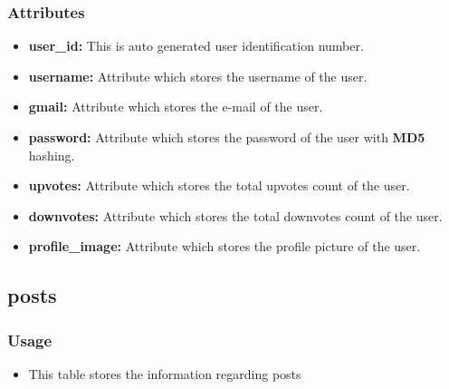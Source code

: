 \documentclass[12pt,a4paper]{article}
\begin{document}
\subsubsection{Attributes}
	\begin{itemize}
		\item \textbf{user\_id: }This is auto generated user identification number.
		\item \textbf{username: }Attribute which stores the username of the user.
		\item \textbf{gmail: }Attribute which stores the e-mail of the user.
		\item \textbf{password: }Attribute which stores the password of the user with \textbf{MD5} hashing.
		\item \textbf{upvotes: }Attribute which stores the total upvotes count of the user.
		\item \textbf{downvotes: }Attribute which stores the total downvotes count of the user.
		\item \textbf{profile\_image: }Attribute which stores the profile picture of the user.
	\end{itemize}
	\subsection{posts}
		\subsubsection{Usage}
	\begin{itemize}
		\item This table stores the information regarding posts 
	\end{itemize}
\end{document}
